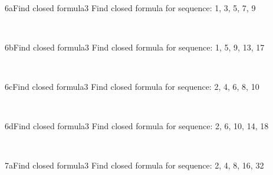 \documentclass[a4paper,12pt]{book}
\begin{document}
    \newpage
    ~\\
    \begin{answersheetquestion}{6a}{Find closed formula}{3}
        Find closed formula for sequence: 1, 3, 5, 7, 9
        \iftoggle{answerkey}{ \begin{answer} $a_{n} = a_{n-1} + 2$ \end{answer} }{ { ~\\ \raisebox{0pt}[2cm][0pt]{  } } }
    \end{answersheetquestion}

    ~\\
    \begin{answersheetquestion}{6b}{Find closed formula}{3}
        Find closed formula for sequence: 1, 5, 9, 13, 17
        \iftoggle{answerkey}{ \begin{answer} $a_{n} = a_{n-1} + 4$ \end{answer} }{ { ~\\ \raisebox{0pt}[2cm][0pt]{  } } }
    \end{answersheetquestion}

    ~\\
    \begin{answersheetquestion}{6c}{Find closed formula}{3}
        Find closed formula for sequence: 2, 4, 6, 8, 10
        \iftoggle{answerkey}{ \begin{answer} $a_{n} = a_{n-1} + 2$ \end{answer} }{ { ~\\ \raisebox{0pt}[2cm][0pt]{  } } }
    \end{answersheetquestion}

    ~\\
    \begin{answersheetquestion}{6d}{Find closed formula}{3}
        Find closed formula for sequence: 2, 6, 10, 14, 18
        \iftoggle{answerkey}{ \begin{answer} $a_{n} = a_{n-1} + 4$ \end{answer} }{ { ~\\ \raisebox{0pt}[2cm][0pt]{  } } }
    \end{answersheetquestion}

    \hrulefill

    ~\\
    \begin{answersheetquestion}{7a}{Find closed formula}{3}
        Find closed formula for sequence: 2, 4, 8, 16, 32
        \iftoggle{answerkey}{ \begin{answer} $a_{n} = 2 \cdot a_{n-1}$ \end{answer} }{ { ~\\ \raisebox{0pt}[2cm][0pt]{  } } }
    \end{answersheetquestion}
\end{document}
